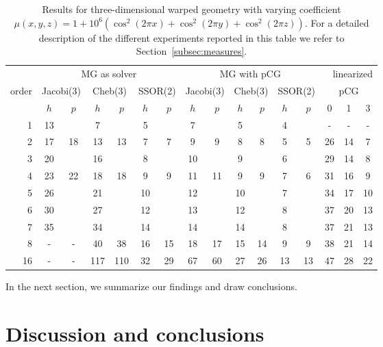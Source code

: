 \documentclass[smallcondensed,final]{svjour3}     %
\begin{document}
\begin{table}
  \caption{\label{tab:3d-fan} Results for three-dimensional warped
    geometry with varying coefficient $\mu(x,y,z) = 1 +
    10^6(\cos^2(2\pi x) + \cos^2(2\pi y) + \cos^2(2\pi z))$. For a
    detailed description of the different experiments reported in this
    table we refer to Section~\ref{subsec:measures}.}  \centering
	  \begin{tabular}{|r|c c|c c|c c||c c|c c|c c||c c c|} 
	    \hline
	    & \multicolumn{6}{c||}{MG as solver} & \multicolumn{6}{c||}{MG with pCG} & \multicolumn{3}{r|}{linearized} \\
	    \cline{2-13}
	    \!\!\! order \!\!\!\! &  \multicolumn{2}{c|}{\!\scriptsize  Jacobi(3)\!} &  \multicolumn{2}{c|}{\!\scriptsize Cheb(3)\!} & \multicolumn{2}{c||}{\!\scriptsize  SSOR(2)\!} & \multicolumn{2}{c|}{\!\scriptsize Jacobi(3)\!} &  \multicolumn{2}{c|}{\!\scriptsize Cheb(3)\!} & \multicolumn{2}{c||}{\!\scriptsize SSOR(2)\!} & \multicolumn{3}{c|}{pCG}\\
	\hline
	 & $h$ & $p$ & $h$ & $p$& $h$ & $p$& $h$ & $p$& $h$ & $p$& $h$ & $p$& 0 & 1 & 3\\
	 \cline{2-16}
1 & 13 & & 7 & & 5 & & 7 & & 5 & & 4 & & - & - & - \\
2 & 17 & 18 & 13 & 13 & 7 & 7 & 9 & 9 & 8 & 8 & 5 & 5 & 26 & 14 & 7 \\
3 & 20 & & 16 & & 8 & & 10 & & 9 & & 6 & & 29 & 14 & 8 \\
4 & 23 & 22 & 18 & 18 & 9 & 9 & 11 & 11 & 9 & 9 & 7 & 6 & 31 & 16 & 9\\
5 & 26 & & 21 & & 10 & & 12 & & 10 & & 7 & & 34 & 17 & 10  \\
6 & 30 & & 27 & & 12 & & 13 & & 12 & & 8 & & 37 & 20 & 13 \\
7 & 35 & & 34 & & 14 & & 14 & & 14 & & 8 & & 37 & 21 & 13  \\
8 & - & - & 40 & 38 & 16 & 15 & 18 & 17 & 15 & 14 & 9 & 9 & 38 & 21 & 14 \\
16 & - & - & 117 & 110 & 32 & 29 & 67 & 60 & 27 & 26 & 13 & 13 & 47 & 28 & 22 \\
\hline
  \end{tabular}
\end{table}

In the next section, we summarize our findings and draw conclusions.

\section{Discussion and conclusions}
\label{sec:discuss}
\end{document}
